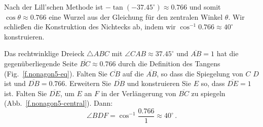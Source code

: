 Nach der Lill'schen Methode ist $-\tan (-37.45^\circ)\approx 0.766$ und somit $\cos \theta \approx 0.766$ eine Wurzel aus der Gleichung für den zentralen Winkel $\theta$. Wir schließen die Konstruktion des Nichtecks ab, indem wir $\cos^{-1} 0.766\approx 40^\circ$ konstruieren.

Das rechtwinklige Dreieck $\triangle ABC$ mit $\angle CAB\approx 37.45^\circ$ und $\overline{AB}=1$ hat die gegenüberliegende Seite $\overline{BC}\approx 0.766$ durch die Definition des Tangens (Fig.~\ref{f.nonagon5-eq}).
Falten Sie $\overline{CB}$ auf die $\overline{AB}$, so dass die Spiegelung von $C$ $D$ ist und $\overline{DB}=0.766$. Erweitern Sie $\overline{DB}$ und konstruieren Sie $E$ so, dass $\overline{DE}=1$ ist.
Falten Sie $\overline{DE}$, um $E$ an $F$ in der Verlängerung von $\overline{BC}$ zu spiegeln (Abb.~\ref{f.nonagon5-central}). Dann:
\[
\angle BDF=\cos^{-1} \frac{0.766}{1}\approx 40^\circ\,.
\]

